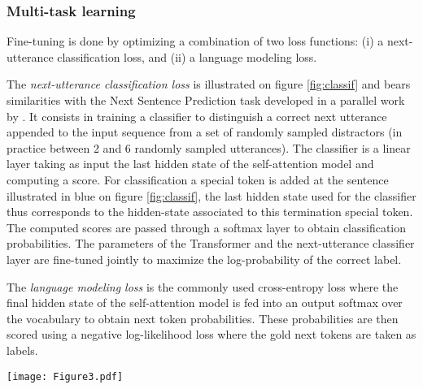 \documentclass[letterpaper]{article} \usepackage{aaai19}  \usepackage{times}  \usepackage{helvet}  \usepackage{courier}  \usepackage{url}  \usepackage{graphicx}  \usepackage{natbib}
\begin{document}
\subsubsection{Multi-task learning}
Fine-tuning is done by optimizing a combination of two loss functions: (i) a next-utterance classification loss, and (ii) a language modeling loss.

The \textit{next-utterance classification loss} is illustrated on figure \ref{fig:classif} and bears similarities with the Next Sentence Prediction task developed in a parallel work by \citeauthor{devlin_bert:_2018}. It consists in training a classifier to distinguish a correct next utterance appended to the input sequence from a set of randomly sampled distractors (in practice between 2 and 6 randomly sampled utterances). The classifier is a linear layer taking as input the last hidden state of the self-attention model and computing a score. For classification a special token  is added at the sentence illustrated in blue on figure \ref{fig:classif}, the last hidden state used for the classifier thus corresponds to the hidden-state associated to this termination special token. The computed scores are passed through a softmax layer to obtain classification probabilities. The parameters of the Transformer and the next-utterance classifier layer are fine-tuned jointly to maximize the log-probability of the correct label.

The \textit{language modeling loss} is the commonly used cross-entropy loss where the final hidden state of the self-attention model is fed into an output softmax over the vocabulary to obtain next token probabilities. These probabilities are then scored using a negative log-likelihood loss where the gold next tokens are taken as labels.


\begin{figure*}
	\texttt{[image: Figure3.pdf]}
    \caption{TranferTransfor input representation. The input embeddings is the sum of the word embeddings, the dialog state
embeddings and the positional embeddings.}
    \label{fig:classif}
\end{figure*}
\end{document}
